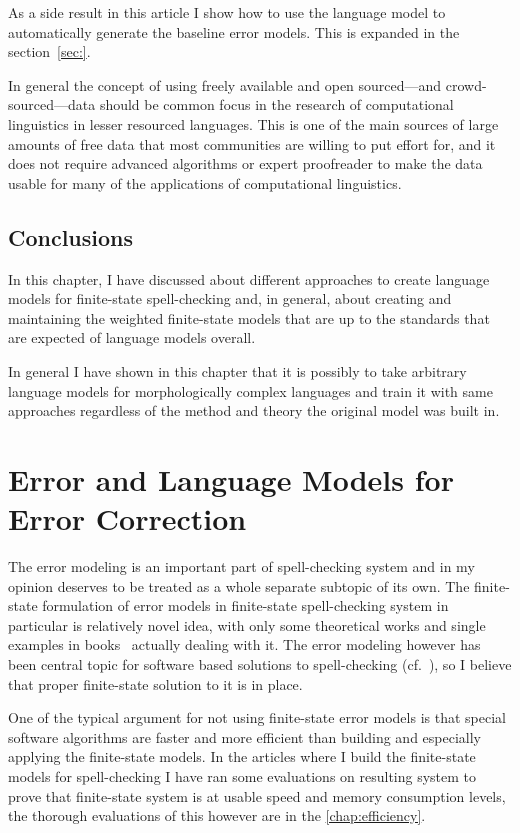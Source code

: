 \documentclass[officiallayout,draft]{unihelcompling}
\begin{document}
As a side result in this article I show how to use the language model to
automatically generate the baseline error models. This is expanded in
the section~\ref{sec:}.

In general the concept of using freely available and open sourced---and
crowd-sourced---data should be common focus in the research of computational
linguistics in lesser resourced languages. This is one of the main sources of
large amounts of free data that most communities are willing to put effort for,
and it does not require advanced algorithms or expert proofreader to make the
data usable for many of the applications of computational linguistics.

\section{Conclusions}

In this chapter, I have discussed about different approaches to create language
models for finite-state spell-checking and, in general, about creating and
maintaining the weighted finite-state models that are up to the standards that
are expected of language models overall. 

In general I have shown in this chapter that it is possibly to take arbitrary
language models for morphologically complex languages and train it with same
approaches regardless of the method and theory the original model was built in.


\chapter{Error and Language Models for Error Correction}
\label{chap:error-models}

The error modeling is an important part of spell-checking system and in my
opinion deserves to be treated as a whole separate subtopic of its own. The
finite-state formulation of error models in finite-state spell-checking system
in particular is relatively novel idea, with only some theoretical works
\cite{agata2002typographical,mohri2003edit} and single examples in
books~\cite{beesley2003finite} actually dealing with it. The error modeling
however has been central topic for software based solutions to spell-checking
(cf.~\cite{kukich1992,mitton2008,deorowicz}), so I believe that proper
finite-state solution to it is in place.

One of the typical argument for not using finite-state error models is that
special software algorithms are faster and more efficient than building and
especially applying the finite-state models. In the articles where I build
the finite-state models for spell-checking I have ran some evaluations on
resulting system to prove that finite-state system is at usable speed
and memory consumption levels, the thorough evaluations of this however
are in the \ref{chap:efficiency}.
\end{document}
